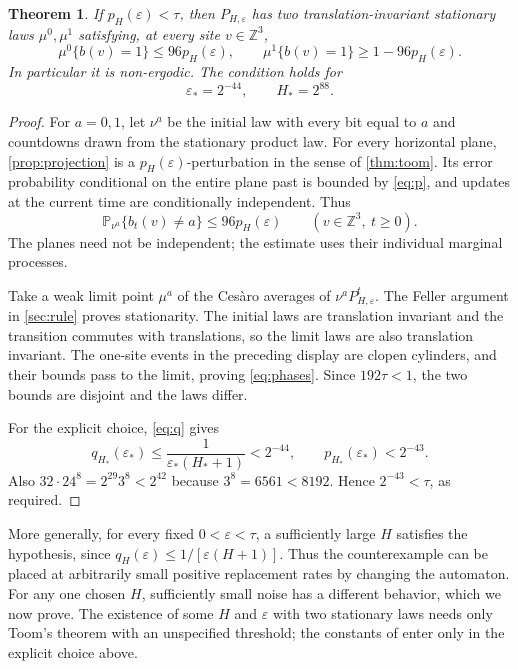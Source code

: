 \documentclass[11pt]{article}
\theoremstyle{plain}
\newtheorem{theorem}{Theorem}[section]
\theoremstyle{definition}
\theoremstyle{remark}
\newcommand{\Z}{\mathbb Z}
\newcommand{\Prob}{\mathbb P}
\newcommand{\eps}{\varepsilon}
\begin{document}
\begin{theorem}\label{thm:coexistence}
If $p_H(\eps)<\tau$, then $P_{H,\eps}$ has two translation-invariant stationary laws $\mu^0,\mu^1$ satisfying, at every site $v\in\Z^3$,
\begin{equation}\label{eq:phases}
 \mu^0\{b(v)=1\}\leq96p_H(\eps),\qquad
 \mu^1\{b(v)=1\}\geq1-96p_H(\eps).
\end{equation}
In particular it is non-ergodic. The condition holds for
\begin{equation}\label{eq:explicit}
 \eps_*=2^{-44},\qquad H_*=2^{88}.
\end{equation}
\end{theorem}
\begin{proof}
For $a=0,1$, let $\nu^a$ be the initial law with every bit equal to $a$ and countdowns drawn from the stationary product law. For every horizontal plane, \cref{prop:projection} is a $p_H(\eps)$-perturbation in the sense of \cref{thm:toom}. Its error probability conditional on the entire plane past is bounded by \eqref{eq:p}, and updates at the current time are conditionally independent. Thus
\[
 \Prob_{\nu^a}\{b_t(v)\ne a\}\leq96p_H(\eps)
 \qquad(v\in\Z^3,\ t\geq0).
\]
The planes need not be independent; the estimate uses their individual marginal processes.

Take a weak limit point $\mu^a$ of the Ces\`aro averages of $\nu^aP_{H,\eps}^t$. The Feller argument in \cref{sec:rule} proves stationarity. The initial laws are translation invariant and the transition commutes with translations, so the limit laws are also translation invariant. The one-site events in the preceding display are clopen cylinders, and their bounds pass to the limit, proving \eqref{eq:phases}. Since $192\tau<1$, the two bounds are disjoint and the laws differ.

For the explicit choice, \eqref{eq:q} gives
\[
 q_{H_*}(\eps_*)\leq\frac1{\eps_*(H_*+1)}<2^{-44},
 \qquad p_{H_*}(\eps_*)<2^{-43}.
\]
Also $32\cdot24^8=2^{29}3^8<2^{42}$ because $3^8=6561<8192$. Hence $2^{-43}<\tau$, as required.
\end{proof}

More generally, for every fixed $0<\eps<\tau$, a sufficiently large $H$ satisfies the hypothesis, since $q_H(\eps)\leq1/[\eps(H+1)]$. Thus the counterexample can be placed at arbitrarily small positive replacement rates by changing the automaton. For any one chosen $H$, sufficiently small noise has a different behavior, which we now prove. The existence of some $H$ and $\eps$ with two stationary laws needs only Toom's theorem \cite{Toom80} with an unspecified threshold; the constants of \cite{Gacs21} enter only in the explicit choice above.
\end{document}
